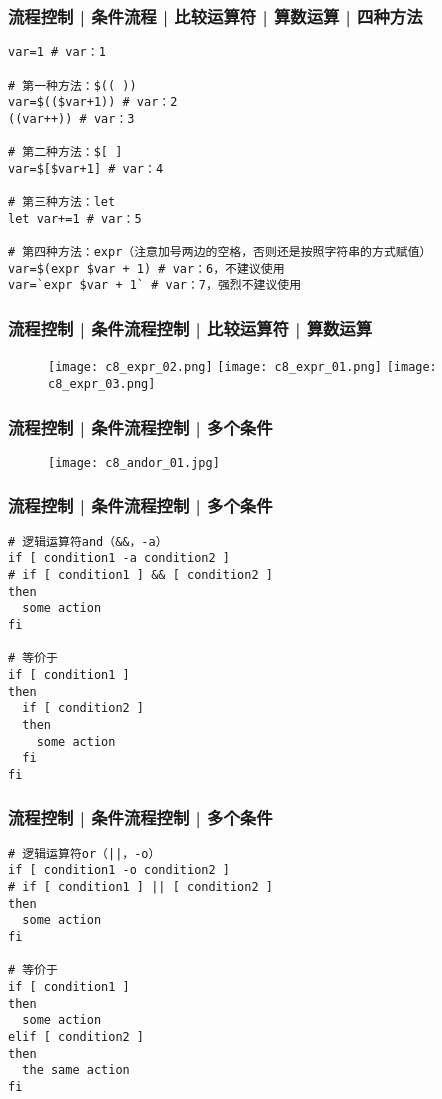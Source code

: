 \begin{frame}[fragile]
  \frametitle{流程控制 | 条件流程 | 比较运算符 | 算数运算 | \alert{四种方法}}
\begin{lstlisting}
var=1 # var：1

# 第一种方法：$(( ))
var=$(($var+1)) # var：2
((var++)) # var：3

# 第二种方法：$[ ]
var=$[$var+1] # var：4

# 第三种方法：let
let var+=1 # var：5

# 第四种方法：expr（注意加号两边的空格，否则还是按照字符串的方式赋值）
var=$(expr $var + 1) # var：6，不建议使用
var=`expr $var + 1` # var：7，强烈不建议使用
\end{lstlisting}
\end{frame}

\begin{frame}[fragile]
  \frametitle{流程控制 | 条件流程控制 | 比较运算符 | 算数运算}
  \begin{figure}
    \centering
    \texttt{[image: c8\_expr\_02.png]}
    \texttt{[image: c8\_expr\_01.png]}
    \vspace{0.3cm}
    \texttt{[image: c8\_expr\_03.png]}
  \end{figure}
\end{frame}

\begin{frame}
  \frametitle{流程控制 | 条件流程控制 | \alert{多个条件}}
  \begin{figure}
    \centering
    \texttt{[image: c8\_andor\_01.jpg]}
  \end{figure}
\end{frame}

\begin{frame}[fragile]
  \frametitle{流程控制 | 条件流程控制 | 多个条件}
\begin{lstlisting}
# 逻辑运算符and（&&，-a）
if [ condition1 -a condition2 ]
# if [ condition1 ] && [ condition2 ]
then
  some action
fi

# 等价于
if [ condition1 ]
then
  if [ condition2 ]
  then
    some action
  fi
fi
\end{lstlisting}
\end{frame}

\begin{frame}[fragile]
  \frametitle{流程控制 | 条件流程控制 | 多个条件}
\begin{lstlisting}
# 逻辑运算符or（||，-o）
if [ condition1 -o condition2 ]
# if [ condition1 ] || [ condition2 ]
then
  some action
fi

# 等价于
if [ condition1 ]
then
  some action
elif [ condition2 ]
then
  the same action
fi
\end{lstlisting}
\end{frame}

